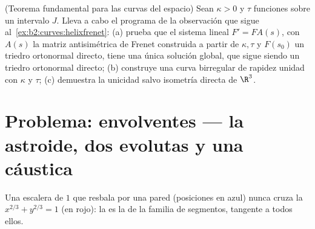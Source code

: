 \begin{exercise}[$\star\star\star$]\label{exo:b2:curves:12}
(Teorema fundamental para las curvas del espacio) Sean $\kappa > 0$ y
$\tau$ funciones  sobre un intervalo $J$. Lleva a cabo el
programa de la observación que sigue al~\cref{ex:b2:curves:helixfrenet}: (a) prueba que el sistema lineal $F'
= FA(s)$, con $A(s)$ la matriz antisimétrica de Frenet construida a
partir de $\kappa, \tau$ y $F(s_0)$ un triedro ortonormal directo,
tiene una única solución global, que sigue siendo un triedro
ortonormal directo; (b) construye una curva birregular de rapidez
unidad con  $\kappa$ y  $\tau$; (c) demuestra la
unicidad salvo isometría directa de $\R^3$.
\end{exercise}

\section{Problema: envolventes --- la astroide, dos evolutas y una
cáustica}

\begin{omfigure}

{\small Una escalera de  $1$ que resbala por una pared
(posiciones en azul) nunca cruza la  $x^{2/3} + y^{2/3} = 1$
(en rojo): la  es la \emph{} de la familia de
segmentos, tangente a todos ellos.}
\end{omfigure}

